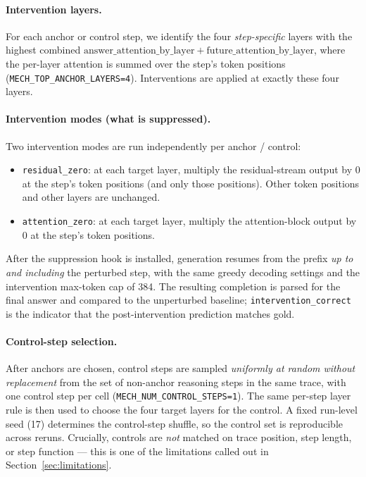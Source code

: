 \documentclass{article}
\theoremstyle{plain}
\theoremstyle{definition}
\theoremstyle{remark}
\begin{document}
\paragraph{Intervention layers.}
For each anchor or control step, we identify the four
\emph{step-specific} layers with the highest combined
$\mathrm{answer\_attention\_by\_layer} +
\mathrm{future\_attention\_by\_layer}$, where the per-layer attention
is summed over the step's token positions
(\texttt{MECH\_TOP\_ANCHOR\_LAYERS=4}). Interventions are applied at
exactly these four layers.

\paragraph{Intervention modes (what is suppressed).}
Two intervention modes are run independently per anchor / control:
\begin{itemize}
\item \texttt{residual\_zero}: at each target layer, multiply the
  residual-stream output by $0$ at the step's token positions
  (and only those positions). Other token positions and other
  layers are unchanged.
\item \texttt{attention\_zero}: at each target layer, multiply the
  attention-block output by $0$ at the step's token positions.
\end{itemize}
After the suppression hook is installed, generation resumes from the
prefix \emph{up to and including} the perturbed step, with the same
greedy decoding settings and the intervention max-token cap of 384.
The resulting completion is parsed for the final answer and compared
to the unperturbed baseline; \texttt{intervention\_correct} is the
indicator that the post-intervention prediction matches gold.

\paragraph{Control-step selection.}
After anchors are chosen, control steps are sampled \emph{uniformly
at random without replacement} from the set of non-anchor reasoning
steps in the same trace, with one control step per cell
(\texttt{MECH\_NUM\_CONTROL\_STEPS=1}). The same per-step layer rule
is then used to choose the four target layers for the control. A
fixed run-level seed (17) determines the control-step shuffle, so the
control set is reproducible across reruns. Crucially, controls are
\emph{not} matched on trace position, step length, or step function
--- this is one of the limitations called out in
Section~\ref{sec:limitations}.
\end{document}

